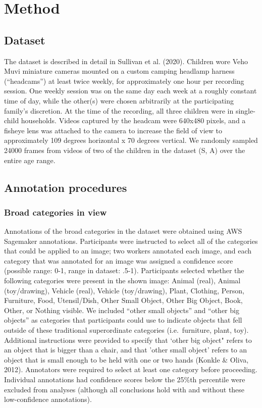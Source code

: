 \documentclass[10pt, letterpaper]{article}
\begin{document}
\hypertarget{method}{%
\section{Method}\label{method}}

\hypertarget{dataset}{%
\subsection{Dataset}\label{dataset}}

The dataset is described in detail in Sullivan et al. (2020). Children
wore Veho Muvi miniature cameras mounted on a custom camping headlamp
harness (``headcams'') at least twice weekly, for approximately one hour
per recording session. One weekly session was on the same day each week
at a roughly constant time of day, while the other(s) were chosen
arbitrarily at the participating family's discretion. At the time of the
recording, all three children were in single-child households. Videos
captured by the headcam were 640x480 pixels, and a fisheye lens was
attached to the camera to increase the field of view to approximately
109 degrees horizontal x 70 degrees vertical. We randomly sampled 24000
frames from videos of two of the children in the dataset (S, A) over the
entire age range.

\hypertarget{annotation-procedures}{%
\subsection{Annotation procedures}\label{annotation-procedures}}

\hypertarget{broad-categories-in-view}{%
\subsubsection{Broad categories in
view}\label{broad-categories-in-view}}

Annotations of the broad categories in the dataset were obtained using
AWS Sagemaker annotations. Participants were instructed to select all of
the categories that could be applied to an image; two workers annotated
each image, and each category that was annotated for an image was
assigned a confidence score (possible range: 0-1, range in dataset:
.5-1). Participants selected whether the following categories were
present in the shown image: Animal (real), Animal (toy/drawing), Vehicle
(real), Vehicle (toy/drawing), Plant, Clothing, Person, Furniture, Food,
Utensil/Dish, Other Small Object, Other Big Object, Book, Other, or
Nothing visible. We included ``other small objects'' and ``other big
objects'' as categories that participants could use to indicate objects
that fell outside of these traditional superordinate categories
(i.e.~furniture, plant, toy). Additional instructions were provided to
specify that `other big object" refers to an object that is bigger than
a chair, and that 'other small object' refers to an object that is small
enough to be held with one or two hands (Konkle \& Oliva, 2012).
Annotators were required to select at least one category before
proceeding. Individual annotations had confidence scores below the
25\%th percentile were excluded from analyses (although all conclusions
hold with and without these low-confidence annotations).
\end{document}
